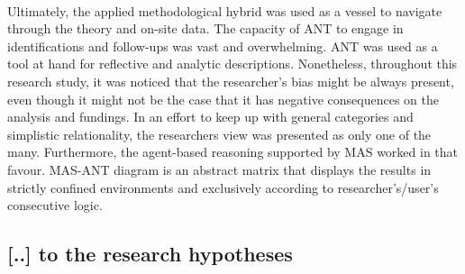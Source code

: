 \documentclass[11pt]{report}
\begin{document}
\\
Ultimately, the applied methodological hybrid was used as a vessel to navigate through the theory and on-site data.
The capacity of ANT to engage in identifications and follow-ups was vast and overwhelming. ANT was used as a tool at hand for reflective and analytic descriptions.
Nonetheless, throughout this research study, it was noticed that the researcher's bias might be always present, even though it might not be the case that it has negative consequences on the analysis and fundings. In an effort to keep up with general categories and simplistic relationality, the researchers view was presented as only one of the many. 
Furthermore, the agent-based reasoning supported by MAS worked in that favour. MAS-ANT diagram is an abstract matrix that displays the results in strictly confined environments and exclusively according to researcher's/user's consecutive logic.

\subsection{[..] to the research hypotheses}
\end{document}
